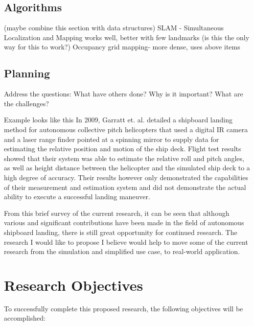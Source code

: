 \documentclass[12pt, letterpaper]{article}
\begin{document}
\subsection{Algorithms} (maybe combine this section with data structures)
SLAM - Simultaneous Localization and Mapping works well, better with few landmarks (is this the only way for this to work?)
Occupancy grid mapping- more dense, uses above items

\subsection{Planning}


Address the questions: What have others done? Why is it important? What are the challenges?  

Example looks like this In 2009, Garratt et. al. \cite{Garratt2009} detailed a shipboard landing method for autonomous collective pitch helicopters that used a digital IR camera and a laser range finder pointed at a spinning mirror to supply data for estimating the relative position and motion of the ship deck.  Flight test results showed that their system was able to estimate the relative roll and pitch angles, as well as height distance between the helicopter and the simulated ship deck to a high degree of accuracy.  Their results however only demonstrated the capabilities of their measurement and estimation system and did not demonstrate the actual ability to execute a successful landing maneuver.  


From this brief survey of the current research, it can be seen that although various and significant contributions have been made in the field of autonomous shipboard landing, there is still great opportunity for continued research.  The research I would like to propose I believe would help to move some of the current research from the simulation and simplified use case, to real-world application.

\section{Research Objectives}

To successfully complete this proposed research, the following objectives will be accomplished:
\end{document}
